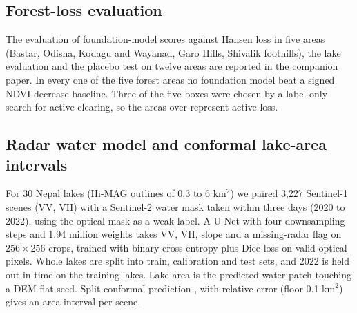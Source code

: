 \documentclass[11pt]{article}
\begin{document}
\subsection{Forest-loss evaluation}

The evaluation of foundation-model scores against Hansen loss in five areas (Bastar, Odisha, Kodagu and Wayanad, Garo Hills, Shivalik foothills), the lake evaluation and the placebo test on twelve areas are reported in the companion paper. In every one of the five forest areas no foundation model beat a signed NDVI-decrease baseline. Three of the five boxes were chosen by a label-only search for active clearing, so the areas over-represent active loss.

\subsection{Radar water model and conformal lake-area intervals}

For 30 Nepal lakes (Hi-MAG outlines of 0.3 to 6 km$^2$) we paired 3,227 Sentinel-1 scenes (VV, VH) with a Sentinel-2 water mask taken within three days (2020 to 2022), using the optical mask as a weak label. A U-Net \cite{ronneberger2015} with four downsampling steps and 1.94 million weights takes VV, VH, slope and a missing-radar flag on $256 \times 256$ crops, trained with binary cross-entropy plus Dice loss on valid optical pixels. Whole lakes are split into train, calibration and test sets, and 2022 is held out in time on the training lakes. Lake area is the predicted water patch touching a DEM-flat seed. Split conformal prediction \cite{vovk2005}, \cite{angelopoulos2021} with relative error (floor 0.1 km$^2$) gives an area interval per scene.

\begin{table}[t]\centering\small
\caption{Radar water model, mean IoU with the optical mask (U-Net mean and standard deviation over three seeds) against a radar Otsu threshold \cite{otsu1979}.}\label{tab:unet}
\end{table}
\end{document}
